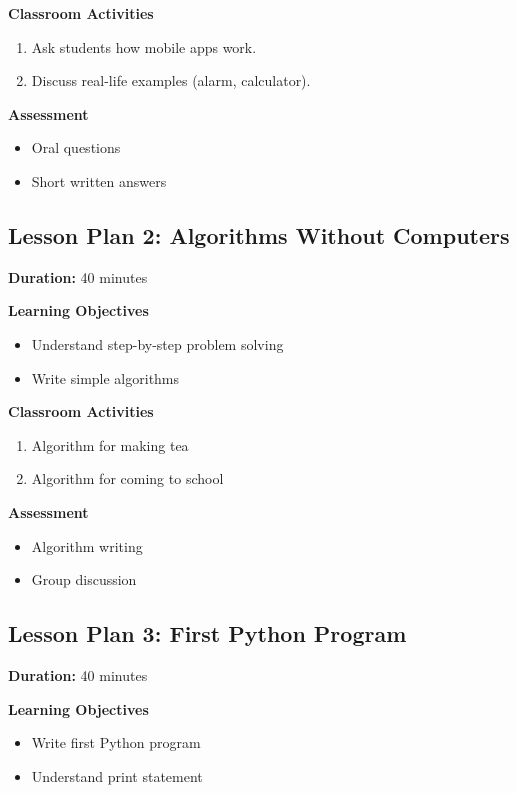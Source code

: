 \textbf{Classroom Activities}
\begin{enumerate}
    \item Ask students how mobile apps work.
    \item Discuss real-life examples (alarm, calculator).
\end{enumerate}

\textbf{Assessment}
\begin{itemize}
    \item Oral questions
    \item Short written answers
\end{itemize}

\subsection*{Lesson Plan 2: Algorithms Without Computers}

\textbf{Duration:} 40 minutes

\textbf{Learning Objectives}
\begin{itemize}
    \item Understand step-by-step problem solving
    \item Write simple algorithms
\end{itemize}

\textbf{Classroom Activities}
\begin{enumerate}
    \item Algorithm for making tea
    \item Algorithm for coming to school
\end{enumerate}

\textbf{Assessment}
\begin{itemize}
    \item Algorithm writing
    \item Group discussion
\end{itemize}

\subsection*{Lesson Plan 3: First Python Program}

\textbf{Duration:} 40 minutes

\textbf{Learning Objectives}
\begin{itemize}
    \item Write first Python program
    \item Understand print statement
\end{itemize}

